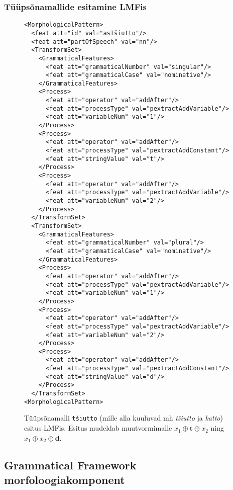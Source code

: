\documentclass[12pt,a4paper]{article}
\begin{document}
\subsubsection{Tüüpsõnamallide esitamine LMFis}

\begin{figure}[p]
  \center
\begin{verbatim}
<MorphologicalPattern>
  <feat att="id" val="asTšiutto"/>
  <feat att="partOfSpeech" val="nn"/>
  <TransformSet>
    <GrammaticalFeatures>
      <feat att="grammaticalNumber" val="singular"/>
      <feat att="grammaticalCase" val="nominative"/>
    </GrammaticalFeatures>
    <Process>
      <feat att="operator" val="addAfter"/>
      <feat att="processType" val="pextractAddVariable"/>
      <feat att="variableNum" val="1"/>
    </Process>
    <Process>
      <feat att="operator" val="addAfter"/>
      <feat att="processType" val="pextractAddConstant"/>
      <feat att="stringValue" val="t"/>
    </Process>
    <Process>
      <feat att="operator" val="addAfter"/>
      <feat att="processType" val="pextractAddVariable"/>
      <feat att="variableNum" val="2"/>
    </Process>
  </TransformSet>
  <TransformSet>
    <GrammaticalFeatures>
      <feat att="grammaticalNumber" val="plural"/>
      <feat att="grammaticalCase" val="nominative"/>
    </GrammaticalFeatures>
    <Process>
      <feat att="operator" val="addAfter"/>
      <feat att="processType" val="pextractAddVariable"/>
      <feat att="variableNum" val="1"/>
    </Process>
    <Process>
      <feat att="operator" val="addAfter"/>
      <feat att="processType" val="pextractAddVariable"/>
      <feat att="variableNum" val="2"/>
    </Process>
    <Process>
      <feat att="operator" val="addAfter"/>
      <feat att="processType" val="pextractAddConstant"/>
      <feat att="stringValue" val="d"/>
    </Process>
  </TransformSet>
<MorphologicalPattern>
\end{verbatim}
\caption{Tüüpsõnamalli \texttt{tšiutto} (mille alla kuuluvad mh \textit{tšiutto} ja \textit{katto}) esitus LMFis. Esitus mudeldab muutvormimalle $x_1 \oplus \textbf{t} \oplus x_2$ ning $x_1 \oplus x_2 \oplus \textbf{d}$.
  \label{code:lmf-paradigmpattern}}
\end{figure}




\subsection{Grammatical Framework morfoloogiakomponent}
\end{document}

